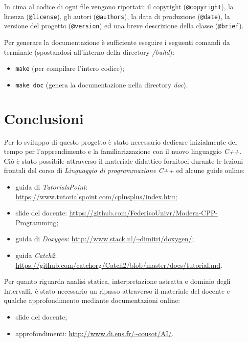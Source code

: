 \documentclass[a4paper, 10pt]{report}
\begin{document}
\noindent
In cima al codice di ogni file vengono riportati: il copyright (\verb|@copyright|), la licenza (\verb|@license|), gli autori (\verb|@authors|), la data di produzione (\verb|@date|), la versione del progetto (\verb|@version|) ed una breve descrizione della classe (\verb|@brief|).
\newline

\noindent
Per generare la documentazione è sufficiente eseguire i seguenti comandi da terminale (spostandosi all'interno della directory \textit{/build}):
\begin{itemize}
	\item \verb|make| (per compilare l'intero codice);
	\item \verb|make doc| (genera la documentazione nella directory \textit{doc}).
\end{itemize}



\chapter*{Conclusioni}
Per lo sviluppo di questo progetto è stato necessario dedicare inizialmente del tempo per l’apprendimento e la familiarizzazione con il nuovo linguaggio \textit{C++}. Ciò è stato possibile attraverso il materiale didattico fornitoci durante le lezioni frontali del corso di \textit{Linguaggio di programmazione C++} ed alcune guide online:
\begin{itemize}
	\item guida di \textit{TutorialsPoint}: \url{https://www.tutorialspoint.com/cplusplus/index.htm};
	\item slide del docente: \url{https://github.com/FedericoUnivr/Modern-CPP-Programming};
	\item guida di \textit{Doxygen}: \url{http://www.stack.nl/~dimitri/doxygen/};
	\item guida \textit{Catch2}: \url{https://github.com/catchorg/Catch2/blob/master/docs/tutorial.md}.
	\\
\end{itemize}

\noindent
Per quanto riguarda analisi statica, interpretazione astratta e dominio degli Intervalli, è stato necessario un ripasso attraverso il materiale del docente e qualche approfondimento mediante documentazioni online:
\begin{itemize}
	\item slide del docente;
	\item approfondimenti: \url{http://www.di.ens.fr/~cousot/AI/}.
	\\
\end{itemize}
\end{document}
